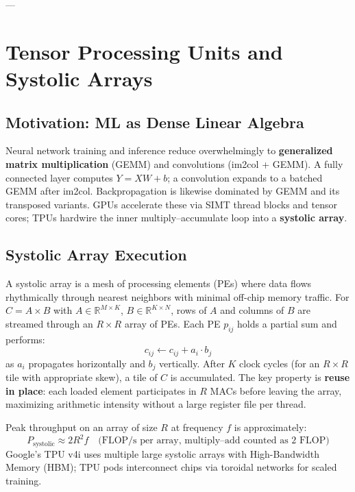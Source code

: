 \documentclass[11pt,journal,onecolumn]{IEEEtran}
\begin{document}
---

\section{Tensor Processing Units and Systolic Arrays}

\subsection{Motivation: ML as Dense Linear Algebra}
Neural network training and inference reduce overwhelmingly to \textbf{generalized matrix multiplication} (GEMM) and convolutions (im2col + GEMM). A fully connected layer computes $Y = XW + b$; a convolution expands to a batched GEMM after im2col. Backpropagation is likewise dominated by GEMM and its transposed variants. GPUs accelerate these via SIMT thread blocks and tensor cores; TPUs hardwire the inner multiply--accumulate loop into a \textbf{systolic array}.

\subsection{Systolic Array Execution}
A systolic array is a mesh of processing elements (PEs) where data flows rhythmically through nearest neighbors with minimal off-chip memory traffic. For $C = A \times B$ with $A \in \mathbb{R}^{M \times K}$, $B \in \mathbb{R}^{K \times N}$, rows of $A$ and columns of $B$ are streamed through an $R \times R$ array of PEs. Each PE $p_{ij}$ holds a partial sum and performs:
\begin{equation}
c_{ij} \leftarrow c_{ij} + a_i \cdot b_j
\end{equation}
as $a_i$ propagates horizontally and $b_j$ vertically. After $K$ clock cycles (for an $R \times R$ tile with appropriate skew), a tile of $C$ is accumulated. The key property is \textbf{reuse in place}: each loaded element participates in $R$ MACs before leaving the array, maximizing arithmetic intensity without a large register file per thread.

Peak throughput on an array of size $R$ at frequency $f$ is approximately:
\begin{equation}
P_{\mathrm{systolic}} \approx 2 R^2 f \quad \text{(FLOP/s per array, multiply--add counted as 2 FLOP)}
\end{equation}
Google's TPU v4i uses multiple large systolic arrays with High-Bandwidth Memory (HBM); TPU pods interconnect chips via toroidal networks for scaled training.
\end{document}
